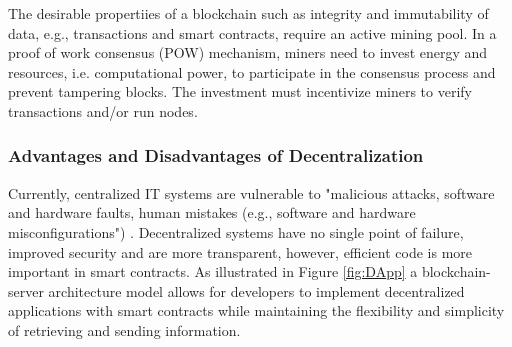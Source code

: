 		The desirable propertiies of a blockchain such as integrity and immutability of data, e.g., transactions and
		smart contracts, require an active mining pool. In a proof of work consensus (POW) mechanism,  miners need to invest energy and resources,
		i.e. computational power, to participate in the consensus process and prevent tampering blocks. The investment must incentivize miners to verify transactions and/or run nodes.%
%		
%		

	
	
	

\subsubsection{Advantages and Disadvantages of Decentralization }
Currently, centralized IT systems are vulnerable to "malicious attacks, software and hardware faults, human mistakes (e.g., software and hardware misconfigurations") \cite{5936160}. Decentralized systems have no single point of failure, improved security and are more transparent, however, efficient code is more important in smart contracts. As illustrated in Figure \ref*{fig:DApp} a blockchain-server architecture model allows for developers to implement decentralized applications with smart contracts while maintaining the flexibility and simplicity of retrieving and sending information.	

